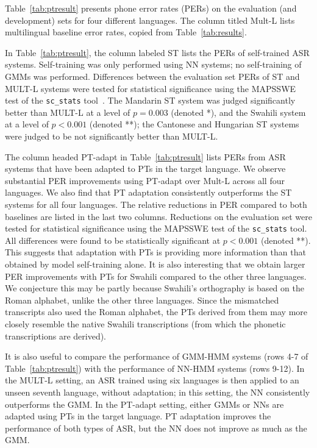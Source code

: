 Table~\ref{tab:ptresult} presents phone error rates (PERs) on the
evaluation (and development) sets for four different languages. The
column titled {\sc Mult-L} lists multilingual baseline error rates,
copied from Table~\ref{tab:results}.

In Table~\ref{tab:ptresult}, the column labeled {\sc ST} lists the
PERs of self-trained ASR systems. Self-training was only performed
using NN systems; no self-training of GMMs was performed.  Differences
between the evaluation set PERs of {\sc ST} and {\sc MULT-L} systems
were tested for statistical significance using the MAPSSWE test of the
{\tt sc\_stats} tool~\cite{Pallet90}.  The Mandarin {\sc ST} system
was judged significantly better than {\sc MULT-L} at a level of
$p=0.003$ (denoted *), and the Swahili system at a level of $p<0.001$
(denoted **); the Cantonese and Hungarian {\sc ST} systems were judged
to be not significantly better than {\sc MULT-L}.

The column headed {\sc PT-adapt} in Table~\ref{tab:ptresult} lists
PERs from ASR systems that have been adapted to PTs in the target
language. We observe substantial PER improvements using {\sc PT-adapt}
over {\sc Mult-L} across all four languages. We also find that PT
adaptation consistently outperforms the {\sc ST} systems for all four
languages. The relative reductions in PER compared to both baselines
are listed in the last two columns.  Reductions on the evaluation set
were tested for statistical significance using the MAPSSWE test of the
{\tt sc\_stats} tool.  All differences were found to be statistically
significant at $p<0.001$ (denoted **).  This suggests that adaptation
with PTs is providing more information than that obtained by model
self-training alone. It is also interesting that we obtain larger PER
improvements with PTs for Swahili compared to the other three
languages. We conjecture this may be partly because Swahili's
orthography is based on the Roman alphabet, unlike the other three
languages. Since the mismatched transcripts also used the Roman
alphabet, the PTs derived from them may more closely resemble the
native Swahili transcriptions (from which the phonetic transcriptions
are derived).

It is also useful to compare the performance of GMM-HMM systems (rows
4-7 of Table~\ref{tab:ptresult}) with the performance of NN-HMM
systems (rows 9-12).  In the {\sc MULT-L} setting, an ASR trained
using six languages is then applied to an unseen seventh language,
without adaptation; in this setting, the NN consistently outperforms
the GMM.  In the {\sc PT-adapt} setting, either GMMs or NNs are
adapted using PTs in the target language.  PT adaptation improves the
performance of both types of ASR, but the NN does not improve as much
as the GMM.

